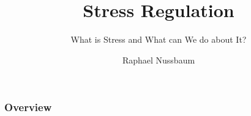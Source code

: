 \documentclass{beamer}
\begin{document}
% 


\title[Stress regulation]{Stress Regulation} %
\subtitle{What is Stress and What can We do about It?}








 \begin{frame}
   \titlepage %
   \author{Raphael Nussbaum}
\end{frame}


\begin{frame}
\frametitle{Overview} %
\tableofcontents %
\end{frame}


\end{document}
